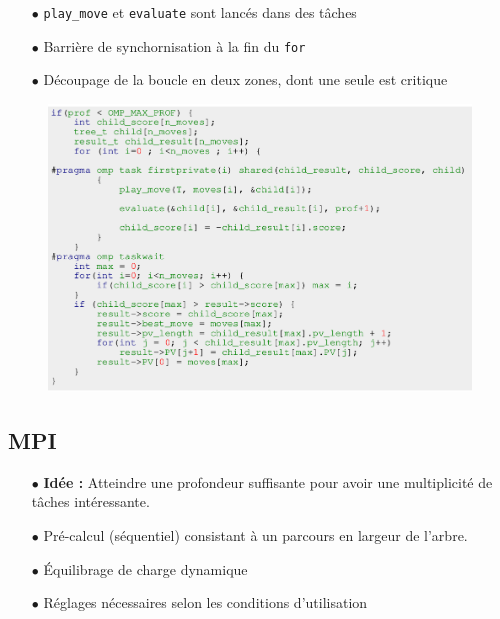 \documentclass[usepdftitle=false,green]{beamer}
\begin{document}
\begin{frame}
    \begin{itemize}
        \item[$\bullet$] \texttt{play\_move} et \texttt{evaluate} sont lancés dans des tâches
        \item[$\bullet$] Barrière de synchornisation à la fin du \texttt{for}
        \item[$\bullet$] Découpage de la boucle en deux zones, dont une seule est critique
    \end{itemize}
    \begin{center}
        \begin{figure}
            \includegraphics[scale=0.2]{pics/code3.png}
        \end{figure}
    \end{center}
\end{frame}

    \subsection{MPI}

\begin{frame}
    \begin{itemize}
        \item[$\bullet$] \textbf{Idée : } Atteindre une profondeur suffisante pour avoir une multiplicité de tâches intéressante.
        \item[$\bullet$] Pré-calcul (séquentiel) consistant à un parcours en largeur de l'arbre.
        \item[$\bullet$] \'Equilibrage de charge dynamique
        \item[$\bullet$] {\color{red} Réglages nécessaires selon les conditions d'utilisation}
    \end{itemize}
\end{frame}
\end{document}

